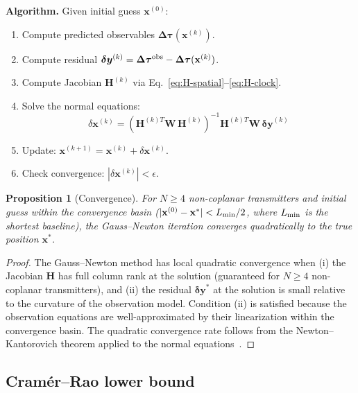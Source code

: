 \documentclass[aps,prd,twocolumn,superscriptaddress,nofootinbib,longbibliography]{revtex4-2}
\newtheorem{proposition}[theorem]{Proposition}
\begin{document}
\textbf{Algorithm.} Given initial guess $\mathbf{x}^{(0)}$:
\begin{enumerate}
\item Compute predicted observables $\boldsymbol{\Delta\tau}(\mathbf{x}^{(k)})$.
\item Compute residual $\boldsymbol{\delta y}^{(k)} = \boldsymbol{\Delta\tau}^{\rm obs}
- \boldsymbol{\Delta\tau}(\mathbf{x}^{(k)})$.
\item Compute Jacobian $\mathbf{H}^{(k)}$ via Eq.~\eqref{eq:H-spatial}--\eqref{eq:H-clock}.
\item Solve the normal equations:
\begin{equation}\label{eq:normal-eq}
\boxed{
\delta\mathbf{x}^{(k)} = \left(\mathbf{H}^{(k)T}\mathbf{W}\,\mathbf{H}^{(k)}\right)^{-1}
\mathbf{H}^{(k)T}\mathbf{W}\,\boldsymbol{\delta y}^{(k)}
}
\end{equation}
\item Update: $\mathbf{x}^{(k+1)} = \mathbf{x}^{(k)} + \delta\mathbf{x}^{(k)}$.
\item Check convergence: $|\delta\mathbf{x}^{(k)}| < \epsilon$.
\end{enumerate}

\begin{proposition}[Convergence]\label{prop:convergence}
For $N \geq 4$ non-coplanar transmitters and initial guess within the
convergence basin ($|\mathbf{x}^{(0)} - \mathbf{x}^*| < L_{\rm min}/2$,
where $L_{\rm min}$ is the shortest baseline), the Gauss--Newton iteration
converges quadratically to the true position $\mathbf{x}^*$.
\end{proposition}

\begin{proof}
The Gauss--Newton method has local quadratic convergence when (i) the
Jacobian $\mathbf{H}$ has full column rank at the solution (guaranteed for
$N \geq 4$ non-coplanar transmitters), and (ii) the residual
$\boldsymbol{\delta y}^*$ at the solution is small relative to the
curvature of the observation model. Condition (ii) is satisfied because
the observation equations are well-approximated by their linearization
within the convergence basin. The quadratic convergence rate follows
from the Newton--Kantorovich theorem applied to the normal
equations~\cite{NumericalRecipes}.
\end{proof}

\subsection{Cram\'er--Rao lower bound}\label{sec:CRLB}
\end{document}
